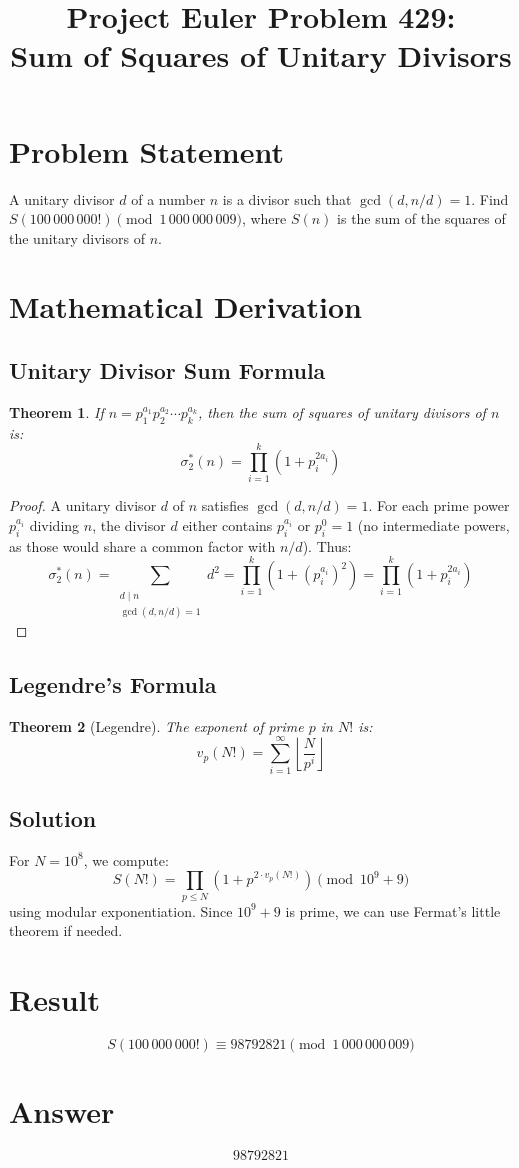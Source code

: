 \documentclass[12pt]{article}
\title{Project Euler Problem 429:\\Sum of Squares of Unitary Divisors}
\author{}
\date{}
\newtheorem{theorem}{Theorem}
\theoremstyle{definition}
\begin{document}
\maketitle

\section{Problem Statement}
A unitary divisor $d$ of a number $n$ is a divisor such that $\gcd(d, n/d) = 1$.
Find $S(100\,000\,000!) \pmod{1\,000\,000\,009}$, where $S(n)$ is the sum of the squares of the unitary divisors of $n$.

\section{Mathematical Derivation}

\subsection{Unitary Divisor Sum Formula}
\begin{theorem}
If $n = p_1^{a_1} p_2^{a_2} \cdots p_k^{a_k}$, then the sum of squares of unitary divisors of $n$ is:
\[
\sigma_2^*(n) = \prod_{i=1}^{k} \left(1 + p_i^{2a_i}\right)
\]
\end{theorem}

\begin{proof}
A unitary divisor $d$ of $n$ satisfies $\gcd(d, n/d) = 1$. For each prime power $p_i^{a_i}$ dividing $n$, the divisor $d$ either contains $p_i^{a_i}$ or $p_i^0 = 1$ (no intermediate powers, as those would share a common factor with $n/d$). Thus:
\[
\sigma_2^*(n) = \sum_{\substack{d \mid n \\ \gcd(d, n/d) = 1}} d^2 = \prod_{i=1}^{k} \left(1 + (p_i^{a_i})^2\right) = \prod_{i=1}^{k} \left(1 + p_i^{2a_i}\right)
\]
\end{proof}

\subsection{Legendre's Formula}
\begin{theorem}[Legendre]
The exponent of prime $p$ in $N!$ is:
\[
v_p(N!) = \sum_{i=1}^{\infty} \left\lfloor \frac{N}{p^i} \right\rfloor
\]
\end{theorem}

\subsection{Solution}
For $N = 10^8$, we compute:
\[
S(N!) = \prod_{p \leq N} \left(1 + p^{2 \cdot v_p(N!)}\right) \pmod{10^9 + 9}
\]
using modular exponentiation. Since $10^9 + 9$ is prime, we can use Fermat's little theorem if needed.

\section{Result}
\[
\boxed{S(100\,000\,000!) \equiv 98792821 \pmod{1\,000\,000\,009}}
\]

\section{Answer}

\[
\boxed{98792821}
\]
\end{document}

